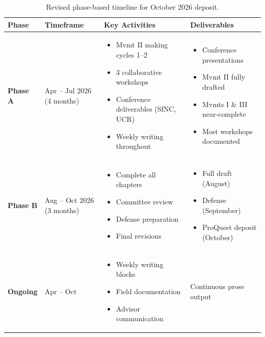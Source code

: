 \begin{table}[H]
	\centering
	\small
	\begin{tabular}{|l|p{3cm}|p{4.5cm}|p{4.5cm}|}
		\hline
		\textbf{Phase} & \textbf{Timeframe} & \textbf{Key Activities} & \textbf{Deliverables} \\
		\hline
		\rowcolor{blue!10}
		\textbf{Phase A} & Apr – Jul 2026 (4 months) &
		\begin{itemize}[nosep,leftmargin=*]
			\item Mvmt II making cycles 1–2
			\item 3 collaborative workshops
			\item Conference deliverables (SfNC, UCR)
			\item Weekly writing throughout
		\end{itemize} &
		\begin{itemize}[nosep,leftmargin=*]
			\item Conference presentations
			\item Mvmt II fully drafted
			\item Mvmts I \& III near-complete
			\item Most workshops documented
		\end{itemize} \\
		\hline
		\rowcolor{green!10}
		\textbf{Phase B} & Aug – Oct 2026 (3 months) &
		\begin{itemize}[nosep,leftmargin=*]
			\item Complete all chapters
			\item Committee review
			\item Defense preparation
			\item Final revisions
		\end{itemize} &
		\begin{itemize}[nosep,leftmargin=*]
			\item Full draft (August)
			\item Defense (September)
			\item ProQuest deposit (October)
		\end{itemize} \\
		\hline
		\rowcolor{gray!10}
		\textbf{Ongoing} & Apr – Oct &
		\begin{itemize}[nosep,leftmargin=*]
			\item Weekly writing blocks
			\item Field documentation
			\item Advisor communication
		\end{itemize} &
		Continuous prose output \\
		\hline
	\end{tabular}
	\caption{Revised phase-based timeline for October 2026 deposit.}
	\label{tab:timeline-revised}
\end{table}